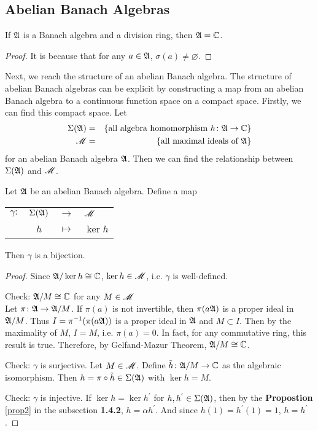 \documentclass[a4paper,11pt]{report}
\begin{document}
\subsection{Abelian Banach Algebras} \label{sec2}
 
 \begin{thm}
	If $\mathfrak{A}$ is a Banach algebra and a division ring, then $\mathfrak{A} = \mathbb{C}$.
\end{thm}
\begin{proof}
	It is because that for any $a \in \mathfrak{A}$, $\sigma(a) \neq \varnothing$.
\end{proof}

Next, we reach the structure of an abelian Banach algebra. The structure of abelian Banach algebras can be explicit by constructing a map from an abelian Banach algebra to a continuous function space on a compact space. Firstly, we can find this compact space. Let 
\begin{eqnarray*}
	\Sigma(\mathfrak{A}) &=& \{ \text{all algebra homomorphism } h \colon \mathfrak{A} \rightarrow \mathbb{C}\}\\
	\mathscr{M} &=& \{\text{all maximal ideals of } \mathfrak{A}\}
\end{eqnarray*}
for an abelian Banach algebra $\mathfrak{A}$. Then we can find the relationship between $\Sigma(\mathfrak{A})$ and $\mathscr{M}$.

\begin{thm}
	Let $\mathfrak{A}$ be an abelian Banach algebra. Define a map
	\begin{center}
		\begin{tabular}{l c c l}
			$\gamma \colon$ & $\Sigma(\mathfrak{A})$ & $\longrightarrow$ & $\mathscr{M}$ \\
			~ & $h$ & $\longmapsto$ & $\ker{h}$
		\end{tabular}
	\end{center}
	Then $\gamma$ is a bijection.
\end{thm}
\begin{proof}
	Since $\mathfrak{A} / \ker{h} \cong \mathbb{C}$, $\ker{h} \in \mathscr{M}$, i.e. $\gamma$ is well-defined.
	\item Check: $\mathfrak{A} / M \cong \mathbb{C}$ for any $M \in \mathscr{M}$\\
		Let $\pi \colon \mathfrak{A} \rightarrow \mathfrak{A} / M$. If $\pi(a)$ is not invertible, then $\pi(a\mathfrak{A})$ is a proper ideal in $\mathfrak{A} / M$. Thus $I = \pi^{-1}(\pi(a\mathfrak{A}))$ is a proper ideal in $\mathfrak{A}$ and $M \subset I$. Then by the maximality of $M$, $I=M$, i.e. $\pi(a)=0$. In fact, for any commutative ring, this result is true. Therefore, by Gelfand-Mazur Theorem, $\mathfrak{A} / M \cong \mathbb{C}$.
	\item Check: $\gamma$ is surjective.
		Let $M \in \mathscr{M}$. Define $\tilde{h} \colon \mathfrak{A} / M \rightarrow \mathbb{C}$ as the algebraic isomorphism. Then $h=\pi \circ \tilde{h} \in \Sigma(\mathfrak{A})$ with $\ker{h} = M$.
	\item Check: $\gamma$ is injective.
		If $\ker{h} = \ker{h^{'}}$ for $h,h^{'} \in \Sigma(\mathfrak{A})$, then by the \textbf{Propostion} \ref{prop2} in the subsection \textbf{1.4.2}, $h = \alpha h^{'}$. And since $h(1) = h^{'}(1)=1$, $h=h^{'}$.
\end{proof}
\end{document}
